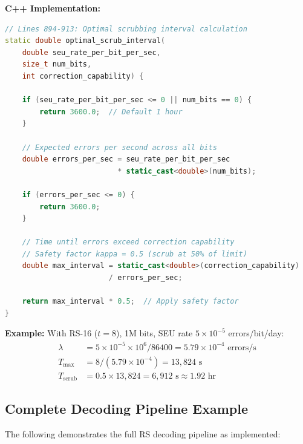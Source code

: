 \documentclass[11pt,a4paper]{article}
\begin{document}
\textbf{C++ Implementation:}
\begin{lstlisting}[language=C++, basicstyle=\small\ttfamily]
// Lines 894-913: Optimal scrubbing interval calculation
static double optimal_scrub_interval(
    double seu_rate_per_bit_per_sec,
    size_t num_bits,
    int correction_capability) {

    if (seu_rate_per_bit_per_sec <= 0 || num_bits == 0) {
        return 3600.0;  // Default 1 hour
    }

    // Expected errors per second across all bits
    double errors_per_sec = seu_rate_per_bit_per_sec
                          * static_cast<double>(num_bits);

    if (errors_per_sec <= 0) {
        return 3600.0;
    }

    // Time until errors exceed correction capability
    // Safety factor kappa = 0.5 (scrub at 50% of limit)
    double max_interval = static_cast<double>(correction_capability)
                        / errors_per_sec;

    return max_interval * 0.5;  // Apply safety factor
}
\end{lstlisting}

\textbf{Example:} With RS-16 ($t=8$), 1M bits, SEU rate $5 \times 10^{-5}$ errors/bit/day:
\begin{align}
\lambda &= 5 \times 10^{-5} \times 10^6 / 86400 = 5.79 \times 10^{-4} \text{ errors/s} \\
T_{\max} &= 8 / (5.79 \times 10^{-4}) = 13{,}824 \text{ s} \\
T_{\text{scrub}} &= 0.5 \times 13{,}824 = 6{,}912 \text{ s} \approx 1.92 \text{ hr}
\end{align}

\subsection{Complete Decoding Pipeline Example}

The following demonstrates the full RS decoding pipeline as implemented:
\end{document}
